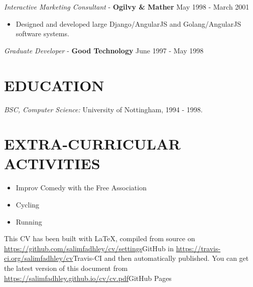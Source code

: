 \documentclass[margin, 10pt]{res} %
\begin{document}
\begin{resume}
         {\sl Interactive Marketing Consultant} - \textbf{Ogilvy \& Mather} \hfill May 1998 - March 2001\\

        \begin{itemize}
            \item Designed and developed large Django/AngularJS and Golang/AngularJS software systems.
        \end{itemize}

        {\sl Graduate Developer} - \textbf{Good Technology} \hfill June 1997 - May 1998\\


        \section{EDUCATION}

        {\sl BSC, Computer Science:} University of Nottingham, 1994 - 1998. \\


        \section{EXTRA-CURRICULAR \\ ACTIVITIES}


        \begin{itemize}
            \item Improv Comedy with the Free Association
            \item Cycling
            \item Running
        \end{itemize}


        {\tiny This CV has been built with \LaTeX, compiled from source on \url{https://github.com/salimfadhley/cv/settings}{GitHub} in \url{https://travis-ci.org/salimfadhley/cv}{Travis-CI} and then
        automatically published. You can get the latest version of this document from \url{https://salimfadhley.github.io/cv/cv.pdf}{GitHub Pages}}

    \end{resume}
\end{document}
